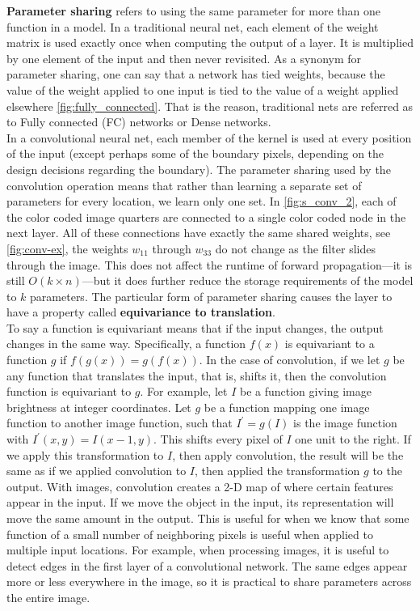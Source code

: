 \textbf{Parameter sharing} refers to using the same parameter for more than one function in a model. In a traditional neural net, each
element of the weight matrix is used exactly once when computing the output of a layer. It is multiplied by one element of the input and
then never revisited. As a synonym for parameter sharing, one can say that a network has tied weights, because the value of the
weight applied to one input is tied to the value of a weight applied elsewhere \cref{fig:fully_connected}.
That is the reason, traditional nets are referred as to Fully connected (FC) networks or Dense networks.\\

In a convolutional neural net, each member of the kernel is used at every position
of the input (except perhaps some of the boundary pixels, depending on the
design decisions regarding the boundary). The parameter sharing used by the
convolution operation means that rather than learning a separate set of parameters
for every location, we learn only one set. In \cref{fig:s_conv_2}, each of the color coded image quarters are connected to a single color
coded node in the next layer. All of these connections have exactly the same shared weights, see \cref{fig:conv-ex}, the weights $w_{11}$
through $w_{33}$ do not change as the filter slides through the image. This does not affect the runtime of
forward propagation—it is still $O(k \times n)$—but it does further reduce the storage
requirements of the model to $k$ parameters. The particular form of parameter sharing causes the
layer to have a property called \textbf{equivariance to translation}. \\

To say a function is equivariant means that if the input changes, the output changes in the same way.
Specifically, a function $f(x)$ is equivariant to a function $g$ if $f(g(x)) = g(f(x))$. In
the case of convolution, if we let $g$ be any function that translates the input, that
is, shifts it, then the convolution function is equivariant to $g$. For example, let $I$
be a function giving image brightness at integer coordinates. Let $g$ be a function
mapping one image function to another image function, such that $I^{\prime} = g(I)$ is the
image function with $I^{\prime}(x, y) = I(x - 1, y)$. This shifts every pixel of $I$ one unit to
the right. If we apply this transformation to $I$, then apply convolution, the result
will be the same as if we applied convolution to $I$, then applied the transformation
$g$ to the output. With images, convolution creates a 2-D map of where certain features appear in the input. If we move the object in the
input, its representation will move the same amount in the output. This is useful for when we know that some function of a small number of
neighboring pixels is useful when applied to multiple input locations. For example, when processing
images, it is useful to detect edges in the first layer of a convolutional network.
The same edges appear more or less everywhere in the image, so it is practical to share parameters across the entire image. \\

